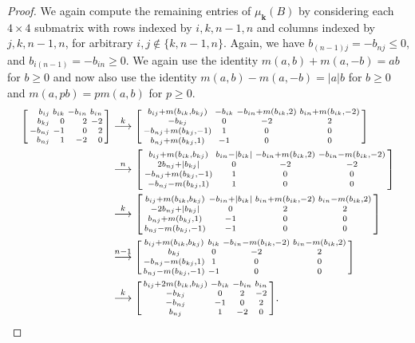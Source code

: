 \documentclass{amsart}
\theoremstyle{definition}
\theoremstyle{remark}
\numberwithin{equation}{section}
\newcommand{\set}[1]{{\lbrace #1 \rbrace}}
\newcommand{\0}{{\mathbf{0}}}
\newcommand{\kk}{{\boldsymbol{k}}}
\begin{document}
\begin{proof}
We again compute the remaining entries of $\mu_\kk(B)$ by considering each $4\times4$ submatrix with rows indexed by $i,k,n-1,n$ and columns indexed by $j,k,n-1,n$, for arbitrary $i,j\not\in\set{k,n-1,n}$.
Again, we have $b_{(n-1)j}=-b_{nj}\le0$, and $b_{i(n-1)}=-b_{in}\ge0$.
We again use the identity $m(a,b)+m(a,-b)=ab$ for $b\ge0$ and now also use the identity $m(a,b)-m(a,-b)=|a|b$ for $b\ge0$ and $m(a,pb)=pm(a,b)$ for $p\ge0$.
\begin{align*}
\begin{bsmallmatrix*}[r]
b_{ij}&b_{ik}&-b_{in}&b_{in}\\
b_{kj}&0&2&-2\\
-b_{nj}&-1&0&2\\
b_{nj}&1&-2&0
\end{bsmallmatrix*}
&\overset{k}{\longrightarrow}
\begin{bsmallmatrix*}
b_{ij}+m(b_{ik},b_{kj}) & -b_{ik} & -b_{in}+m(b_{ik},2) & b_{in}+m(b_{ik},-2)\\
-b_{kj} & 0 & -2 & 2\\
-b_{nj}+m(b_{kj},-1) & 1 & 0 & 0\\
b_{nj}+m(b_{kj},1) & -1 & 0 & 0
\end{bsmallmatrix*}\\
&\overset{n}{\longrightarrow}
\begin{bsmallmatrix*}
b_{ij}+m(b_{ik},b_{kj}) & b_{in}-|b_{ik}| & -b_{in}+m(b_{ik},2) & -b_{in}-m(b_{ik},-2)\\
2b_{nj}+|b_{kj}| & 0 & -2 & -2\\
-b_{nj}+m(b_{kj},-1) & 1 & 0 & 0\\
-b_{nj}-m(b_{kj},1) & 1 & 0 & 0
\end{bsmallmatrix*}\\
&\overset{k}{\longrightarrow}
\begin{bsmallmatrix*}
b_{ij}+m(b_{ik},b_{kj}) & -b_{in}+|b_{ik}| & b_{in}+m(b_{ik},-2) & b_{in}-m(b_{ik},2)\\
-2b_{nj}+|b_{kj}| & 0 & 2 & 2\\
b_{nj}+m(b_{kj},1)  & -1 & 0 & 0\\
b_{nj}-m(b_{kj},-1)& -1 & 0 & 0
\end{bsmallmatrix*}\\
&\overset{n-1}{\longrightarrow}
\begin{bsmallmatrix*}
b_{ij}+m(b_{ik},b_{kj}) & b_{ik} & -b_{in}-m(b_{ik},-2) & b_{in}-m(b_{ik},2)\\
b_{kj}& 0 & -2 & 2\\
-b_{nj}-m(b_{kj},1)& 1 & 0 & 0\\
b_{nj}-m(b_{kj},-1) & -1 & 0 & 0
\end{bsmallmatrix*}\\
&\overset{k}{\longrightarrow}
\begin{bsmallmatrix*}
b_{ij}+2m(b_{ik},b_{kj}) & -b_{ik} & -b_{in} & b_{in}\\
-b_{kj} & 0 & 2 & -2\\
-b_{nj} & -1 & 0 & 2\\
b_{nj} & 1 & -2 & 0
\end{bsmallmatrix*}.
\end{align*}


\end{proof}
\end{document}
